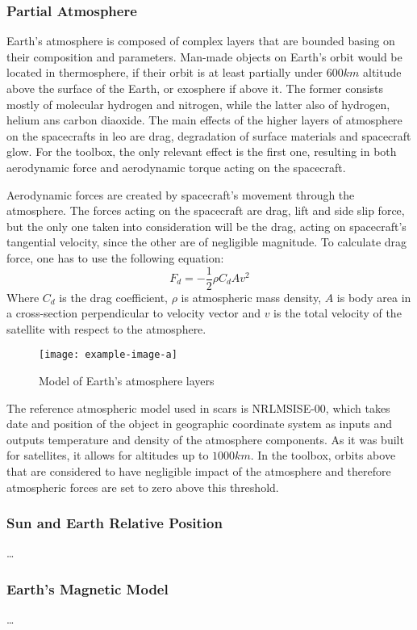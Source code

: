         \subsubsection{Partial Atmosphere}\label{toolbox:atmosphere}
            Earth's atmosphere is composed of complex layers that are bounded basing on their composition and parameters. Man-made objects on Earth's orbit would be located in thermosphere, if their orbit is at least partially under $600km$ altitude above the surface of the Earth, or exosphere if above it. The former consists mostly of molecular hydrogen and nitrogen, while the latter also of hydrogen, helium ans carbon diaoxide. The main effects of the higher layers of atmosphere on the spacecrafts in \ac{leo} are drag, degradation of surface materials and spacecraft glow. For the toolbox, the only relevant effect is the first one, resulting in both aerodynamic force and aerodynamic torque acting on the spacecraft.

            Aerodynamic forces are created by spacecraft's movement through the atmosphere. The forces acting on the spacecraft are drag, lift and side slip force, but the only one taken into consideration will be the drag, acting on spacecraft's tangential velocity, since the other are of negligible magnitude. To calculate drag force, one has to use the following equation:
            \begin{equation}
                F_d = -\frac{1}{2}\rho C_d A v^2
            \end{equation}
            Where $C_d$ is the drag coefficient, $\rho$ is atmospheric mass density, $A$ is body area in a cross-section perpendicular to velocity vector and $v$ is the total velocity of the satellite with respect to the atmosphere. 


            \begin{figure}[H]
                \centering
                \texttt{[image: example-image-a]}
                \caption{Model of Earth's atmosphere layers}
                \label{fig:atmosphere}
            \end{figure}

            The reference atmospheric model used in \ac{scars} is NRLMSISE-00, which takes date and position of the object in geographic coordinate system as inputs and outputs temperature and density of the atmosphere components. As it was built for satellites, it allows for altitudes up to $1000km$. In the toolbox, orbits above that are considered to have negligible impact of the atmosphere and therefore atmospheric forces are set to zero above this threshold.

        \subsubsection{Sun and Earth Relative Position}
            \dots

        \subsubsection{Earth's Magnetic Model}
            \dots